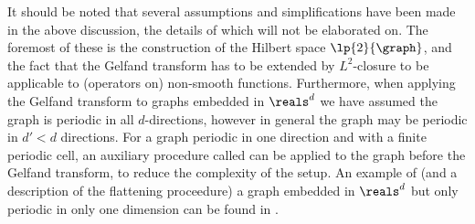 It should be noted that several assumptions and simplifications have been made in the above discussion, the details of which will not be elaborated on.
The foremost of these is the construction of the Hilbert space $\lp{2}{\graph}$, and the fact that the Gelfand transform has to be extended by $L^{2}$-closure to be applicable to (operators on) non-smooth functions.
Furthermore, when applying the Gelfand transform to graphs embedded in $\reals^{d}$ we have assumed the graph is periodic in all $d$-directions, however in general the graph may be periodic in $d'<d$ directions.
For a graph periodic in one direction and with a finite periodic cell, an auxiliary procedure called  can be applied to the graph before the Gelfand transform, to reduce the complexity of the setup.
An example of (and a description of the flattening proceedure) a graph embedded in $\reals^{d}$ but only periodic in only one dimension can be found in \cite{ershova2018gelfand}.


